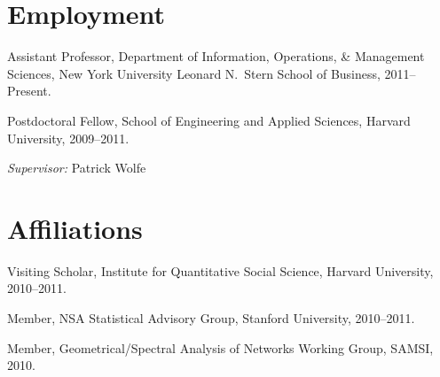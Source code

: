 \documentclass[10pt,letterpaper]{article}
\renewenvironment{itemize}{
  \begin{list}{}{
    \setlength{\leftmargin}{1.5em}
    \setlength{\itemsep}{0.25em}
    \setlength{\parskip}{0pt}
    \setlength{\parsep}{0.25em}
  }
}{
  \end{list}
}
\begin{document}
\section*{Employment}

\begin{itemize}
\item Assistant Professor, Department of Information, Operations, \&
  Management Sciences, New York University Leonard N.~Stern School of Business,
  2011--Present.
\item Postdoctoral Fellow, School of Engineering and Applied Sciences, Harvard
  University, 2009--2011.
  \begin{itemize}
  \item \textit{Supervisor:} Patrick Wolfe
  \end{itemize}
\end{itemize}




\section*{Affiliations}
\begin{itemize}
\item Visiting Scholar, Institute for Quantitative Social Science, Harvard University, 2010--2011.
\item Member, NSA Statistical Advisory Group, Stanford University, 2010--2011.
\item Member, Geometrical/Spectral Analysis of Networks Working Group, SAMSI, 2010.
\end{itemize}
\end{document}
